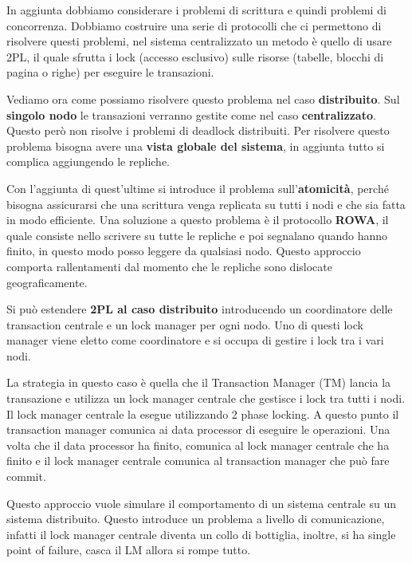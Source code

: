 In aggiunta dobbiamo considerare i problemi di scrittura e quindi problemi di
concorrenza. Dobbiamo costruire una serie di protocolli che ci permettono di
risolvere questi problemi, nel sistema centralizzato un metodo è quello di usare
2PL, il quale sfrutta i lock (accesso esclusivo) sulle risorse (tabelle, blocchi
di pagina o righe) per eseguire le transazioni.

Vediamo ora come possiamo risolvere questo problema nel caso \textbf{distribuito}. Sul
\textbf{singolo nodo} le transazioni verranno gestite come nel caso \textbf{centralizzato}. Questo
però non risolve i problemi di deadlock distribuiti. Per risolvere questo problema
bisogna avere una \textbf{vista globale del sistema}, in aggiunta tutto si complica
aggiungendo le repliche.

Con l'aggiunta di quest'ultime si introduce il problema sull'\textbf{atomicità}, perché
bisogna assicurarsi che una scrittura venga replicata su tutti i nodi e che sia
fatta in modo efficiente. Una soluzione a questo problema è il protocollo \textbf{ROWA},
il quale consiste nello scrivere su tutte le repliche e poi segnalano quando
hanno finito, in questo modo posso leggere da qualsiasi nodo. Questo approccio
comporta rallentamenti dal momento che le repliche sono dislocate geograficamente.

Si può estendere \textbf{2PL al caso distribuito} introducendo un coordinatore delle
transaction centrale e un lock manager per ogni nodo. Uno di questi lock manager
viene eletto come coordinatore e si occupa di gestire i lock tra i vari nodi.

La strategia in questo caso è quella che il Transaction Manager (TM) lancia la
transazione e utilizza un lock manager centrale che gestisce i lock tra tutti i
nodi. Il lock manager centrale la esegue utilizzando 2 phase locking. A questo
punto il transaction manager comunica ai data processor di eseguire le operazioni.
Una volta che il data processor ha finito, comunica al lock manager centrale che
ha finito e il lock manager centrale comunica al transaction manager che può fare
commit.

Questo approccio vuole simulare il comportamento di un sistema centrale su un
sistema distribuito. Questo introduce un problema a livello di comunicazione,
infatti il lock manager centrale diventa un collo di bottiglia, inoltre, si ha
single point of failure, casca il LM allora si rompe tutto.

